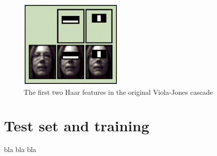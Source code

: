 \begin{figure}[!h]
\begin{center}
\noindent \includegraphics[scale=1]{figures/haar_feature_first_2_features} 
\newline
\caption{The first two Haar features in the original Viola-Jones cascade}
\label{haar_feature_first_2_features}
\end{center} 
\end{figure}

\section{Test set and training}

\vspace{\baselineskip}
\noindent bla bla bla
\newline